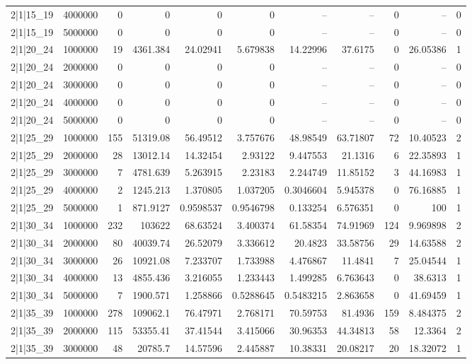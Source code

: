 \begin{tabular}{lrrrrrrrrrr}
2|1|15\_19 & 4000000 & 0 & 0 & 0 & 0 & -- & -- & 0 & -- & 0 \\
2|1|15\_19 & 5000000 & 0 & 0 & 0 & 0 & -- & -- & 0 & -- & 0 \\
2|1|20\_24 & 1000000 & 19 & 4361.384 & 24.02941 & 5.679838 & 14.22996 & 37.6175 & 0 & 26.05386 & 1 \\
2|1|20\_24 & 2000000 & 0 & 0 & 0 & 0 & -- & -- & 0 & -- & 0 \\
2|1|20\_24 & 3000000 & 0 & 0 & 0 & 0 & -- & -- & 0 & -- & 0 \\
2|1|20\_24 & 4000000 & 0 & 0 & 0 & 0 & -- & -- & 0 & -- & 0 \\
2|1|20\_24 & 5000000 & 0 & 0 & 0 & 0 & -- & -- & 0 & -- & 0 \\
2|1|25\_29 & 1000000 & 155 & 51319.08 & 56.49512 & 3.757676 & 48.98549 & 63.71807 & 72 & 10.40523 & 2 \\
2|1|25\_29 & 2000000 & 28 & 13012.14 & 14.32454 & 2.93122 & 9.447553 & 21.1316 & 6 & 22.35893 & 1 \\
2|1|25\_29 & 3000000 & 7 & 4781.639 & 5.263915 & 2.23183 & 2.244749 & 11.85152 & 3 & 44.16983 & 1 \\
2|1|25\_29 & 4000000 & 2 & 1245.213 & 1.370805 & 1.037205 & 0.3046604 & 5.945378 & 0 & 76.16885 & 1 \\
2|1|25\_29 & 5000000 & 1 & 871.9127 & 0.9598537 & 0.9546798 & 0.133254 & 6.576351 & 0 & 100 & 1 \\
2|1|30\_34 & 1000000 & 232 & 103622 & 68.63524 & 3.400374 & 61.58354 & 74.91969 & 124 & 9.969898 & 2 \\
2|1|30\_34 & 2000000 & 80 & 40039.74 & 26.52079 & 3.336612 & 20.4823 & 33.58756 & 29 & 14.63588 & 2 \\
2|1|30\_34 & 3000000 & 26 & 10921.08 & 7.233707 & 1.733988 & 4.476867 & 11.4841 & 7 & 25.04544 & 1 \\
2|1|30\_34 & 4000000 & 13 & 4855.436 & 3.216055 & 1.233443 & 1.499285 & 6.763643 & 0 & 38.6313 & 1 \\
2|1|30\_34 & 5000000 & 7 & 1900.571 & 1.258866 & 0.5288645 & 0.5483215 & 2.863658 & 0 & 41.69459 & 1 \\
2|1|35\_39 & 1000000 & 278 & 109062.1 & 76.47971 & 2.768171 & 70.59753 & 81.4936 & 159 & 8.484375 & 2 \\
2|1|35\_39 & 2000000 & 115 & 53355.41 & 37.41544 & 3.415066 & 30.96353 & 44.34813 & 58 & 12.3364 & 2 \\
2|1|35\_39 & 3000000 & 48 & 20785.7 & 14.57596 & 2.445887 & 10.38331 & 20.08217 & 20 & 18.32072 & 1 \\

\end{tabular}
